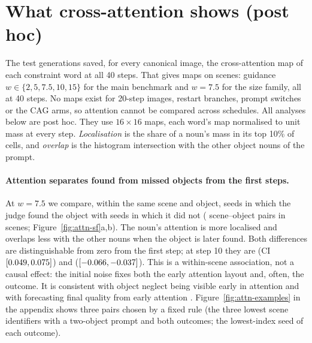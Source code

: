 \section{What cross-attention shows (post hoc)}\label{sec:resATTN}
The test generations saved, for every canonical image, the cross-attention map of each constraint word at all 40 steps. That gives \atFiles{} maps on \atScenes{} scenes: guidance $w\in\{2,5,7.5,10,15\}$ for the main benchmark and $w=7.5$ for the size family, all at 40 steps. No maps exist for 20-step images, restart branches, prompt switches or the CAG arms, so attention cannot be compared across schedules. All analyses below are post hoc. They use $16\times16$ maps, each word's map normalised to unit mass at every step. \emph{Localisation} is the share of a noun's mass in its top 10\% of cells, and \emph{overlap} is the histogram intersection with the other object nouns of the prompt.

\paragraph{Attention separates found from missed objects from the first steps.} At $w=7.5$ we compare, within the same scene and object, seeds in which the judge found the object with seeds in which it did not (\atPairs{} scene--object pairs in \atPairScenes{} scenes; Figure~\ref{fig:attn-sf}a,b). The noun's attention is more localised and overlaps less with the other nouns when the object is later found. Both differences are distinguishable from zero from the first step; at step 10 they are \atLocTen{} (CI $[0.049,0.075]$) and \atOvlTen{} ($[-0.066,-0.037]$). This is a within-scene association, not a causal effect: the initial noise fixes both the early attention layout and, often, the outcome. It is consistent with object neglect being visible early in attention \citep{chefer2023attend} and with forecasting final quality from early attention \citep{diffusionprobe2026}. Figure~\ref{fig:attn-examples} in the appendix shows three pairs chosen by a fixed rule (the three lowest scene identifiers with a two-object prompt and both outcomes; the lowest-index seed of each outcome).

